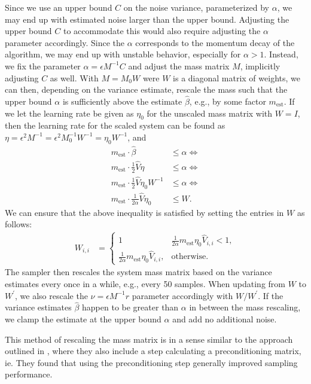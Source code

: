 Since we use an upper bound $C$ on the noise variance, parameterized by $\alpha$, we may end up with estimated noise larger than the upper bound.
Adjusting the upper bound $C$ to accommodate this would also require adjusting the $\alpha$ parameter accordingly.
Since the $\alpha$ corresponds to the momentum decay of the algorithm, we may end up with unstable behavior, especially for $\alpha > 1$. 
Instead, we fix the parameter $\alpha=\epsilon M^{-1}C$ and adjust the mass matrix $M$, implicitly adjusting $C$ as well.
With $M = M_0 W$ were $W$ is a diagonal matrix of weights, we can then, depending on the variance estimate, rescale the mass such that the upper bound $\alpha$ is sufficiently above the estimate $\hat\beta$, e.g., by some factor $m_{\text{est}}$.
If we let the learning rate be given as $\eta_0$  for the unscaled mass matrix with $W = I$, then the learning rate for the scaled system can be found as $\eta = \epsilon^2 M^{-1} = \epsilon^2 M_0^{-1}W^{-1} = \eta_0 W^{-1}$, and
\begin{align}
    m_{\text{est}} \cdot \hat{\beta}  &\leq \alpha \Leftrightarrow\\ 
    m_{\text{est}} \cdot \frac{1}{2} \hat V \eta   &\leq \alpha \Leftrightarrow\\ 
    m_{\text{est}} \cdot \frac{1}{2} \hat V \eta_0 W^{-1}  &\leq \alpha \Leftrightarrow\\ 
    m_{\text{est}} \cdot \frac{1}{2\alpha} \hat V \eta_0   &\leq W.
\end{align}
We can ensure that the above inequality is satisfied by setting the entries in $W$ as follows:  
    \begin{align}
    W_{i,i} &= \begin{cases}
        1 & \frac{1}{2\alpha}m_{\text{est}} \eta_0 \hat{V}_{i,i} < 1, \\
        \frac{1}{2\alpha}m_{\text{est}} \eta_0 \hat{V}_{i,i}, & \text{otherwise}.
    \end{cases}
\end{align}
The sampler then rescales the system mass matrix based on the variance estimates every once in a while, e.g., every 50 samples.
When updating from $W$ to $W^\prime$, we also rescale the $\nu=\epsilon M^{-1}r$ parameter accordingly with $W/W^\prime$.
If the variance estimates $\hat \beta$ happen to be greater than $\alpha$ in between the mass rescaling, we clamp the estimate at the upper bound $\alpha$ and add no additional noise. 

This method of rescaling the mass matrix is in a sense similar to the approach outlined in \autocite{wenzel_how_2020}, where they also include a step calculating a preconditioning matrix, ie.
They found that using the preconditioning step generally improved sampling performance.



